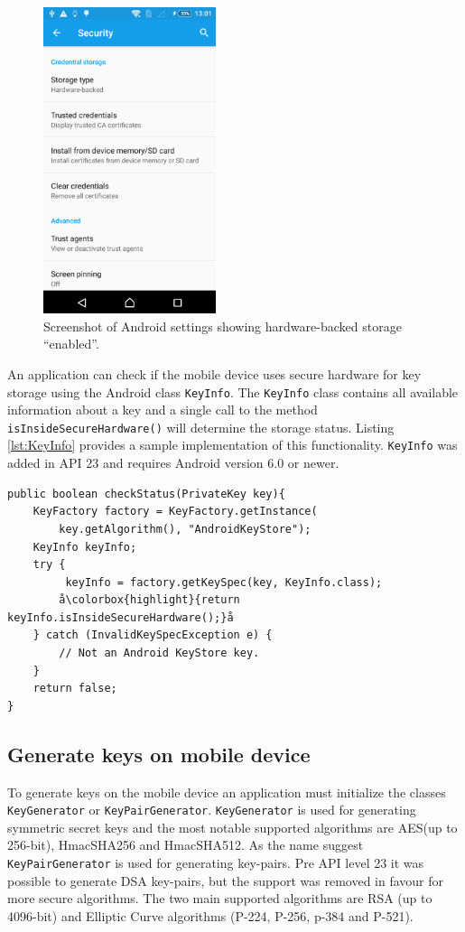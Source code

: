 \begin{figure}[h!]
  \caption{Screenshot of Android settings showing hardware-backed storage ``enabled''.}
  \label{fig:hardwareBacked}
  \centering
    \includegraphics[width=0.45\textwidth]{images/hardwareBacked.png}
\end{figure}

An application can check if the mobile device uses secure hardware for key storage using the Android class \texttt{KeyInfo}. The \texttt{KeyInfo} class contains all available information about a key and a single call to the method \texttt{\allowbreak isInsideSecureHardware()} will determine the storage status. Listing \ref{lst:KeyInfo} provides a sample implementation of this functionality. \texttt{KeyInfo} was added in API 23 and requires Android version 6.0 or newer.

\newpage
\begin{lstlisting}[caption=Obtaining storage status of keys using KeyInfo., label=lst:KeyInfo,escapechar=å]
public boolean checkStatus(PrivateKey key){
    KeyFactory factory = KeyFactory.getInstance(
        key.getAlgorithm(), "AndroidKeyStore");
    KeyInfo keyInfo;
    try {
         keyInfo = factory.getKeySpec(key, KeyInfo.class);
        å\colorbox{highlight}{return keyInfo.isInsideSecureHardware();}å
    } catch (InvalidKeySpecException e) {
        // Not an Android KeyStore key.
    }
    return false;
}
\end{lstlisting}

\subsection{Generate keys on mobile device}
To generate keys on the mobile device an application must initialize the classes \texttt{KeyGenerator} or \texttt{KeyPairGenerator}. \texttt{KeyGenerator} is used for generating symmetric secret keys and the most notable supported algorithms are AES(up to 256-bit), HmacSHA256 and HmacSHA512. As the name suggest \texttt{KeyPairGenerator} is used for generating key-pairs. Pre API level 23 it was possible to generate DSA key-pairs, but the support was removed in favour for more secure algorithms. The two main supported algorithms are RSA (up to 4096-bit) and Elliptic Curve algorithms (P-224, P-256, p-384 and P-521).

